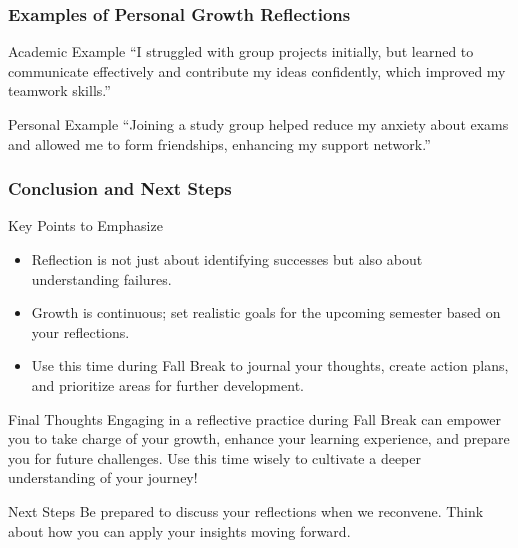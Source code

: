 \documentclass[aspectratio=169]{beamer}
\begin{document}
\begin{frame}[fragile]
    \frametitle{Examples of Personal Growth Reflections}
    \begin{block}{Academic Example}
        “I struggled with group projects initially, but learned to communicate effectively and contribute my ideas confidently, which improved my teamwork skills.”
    \end{block}
    
    \begin{block}{Personal Example}
        “Joining a study group helped reduce my anxiety about exams and allowed me to form friendships, enhancing my support network.”
    \end{block}
\end{frame}

\begin{frame}[fragile]
    \frametitle{Conclusion and Next Steps}
    \begin{block}{Key Points to Emphasize}
        \begin{itemize}
            \item Reflection is not just about identifying successes but also about understanding failures.
            \item Growth is continuous; set realistic goals for the upcoming semester based on your reflections.
            \item Use this time during Fall Break to journal your thoughts, create action plans, and prioritize areas for further development.
        \end{itemize}
    \end{block}
    
    \begin{block}{Final Thoughts}
        Engaging in a reflective practice during Fall Break can empower you to take charge of your growth, enhance your learning experience, and prepare you for future challenges. Use this time wisely to cultivate a deeper understanding of your journey!
    \end{block}
    
    \begin{block}{Next Steps}
        Be prepared to discuss your reflections when we reconvene. Think about how you can apply your insights moving forward.
    \end{block}
\end{frame}
\end{document}
